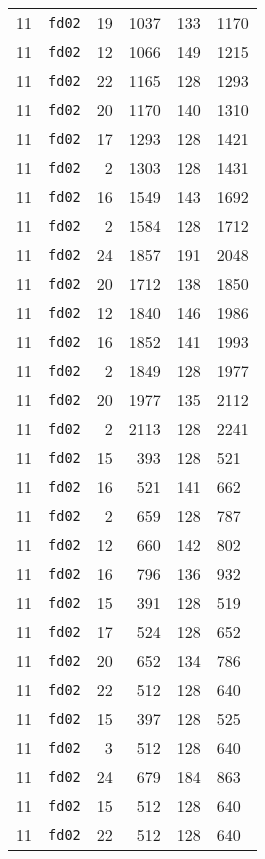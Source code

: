 \documentclass{article}
\begin{document}
\begin{table}[h!]
\begin{tabular}{llrrrl}
    11 & \texttt{fd02} & 19 & 1037 & 133 & 1170 \\
    11 & \texttt{fd02} & 12 & 1066 & 149 & 1215 \\
    11 & \texttt{fd02} & 22 & 1165 & 128 & 1293 \\
    11 & \texttt{fd02} & 20 & 1170 & 140 & 1310 \\
    11 & \texttt{fd02} & 17 & 1293 & 128 & 1421 \\
    11 & \texttt{fd02} & 2 & 1303 & 128 & 1431 \\
    11 & \texttt{fd02} & 16 & 1549 & 143 & 1692 \\
    11 & \texttt{fd02} & 2 & 1584 & 128 & 1712 \\
    11 & \texttt{fd02} & 24 & 1857 & 191 & 2048 \\
    11 & \texttt{fd02} & 20 & 1712 & 138 & 1850 \\
    11 & \texttt{fd02} & 12 & 1840 & 146 & 1986 \\
    11 & \texttt{fd02} & 16 & 1852 & 141 & 1993 \\
    11 & \texttt{fd02} & 2 & 1849 & 128 & 1977 \\
    11 & \texttt{fd02} & 20 & 1977 & 135 & 2112 \\
    11 & \texttt{fd02} & 2 & 2113 & 128 & 2241 \\
    11 & \texttt{fd02} & 15 & 393 & 128 & 521 \\
    11 & \texttt{fd02} & 16 & 521 & 141 & 662 \\
    11 & \texttt{fd02} & 2 & 659 & 128 & 787 \\
    11 & \texttt{fd02} & 12 & 660 & 142 & 802 \\
    11 & \texttt{fd02} & 16 & 796 & 136 & 932 \\
    11 & \texttt{fd02} & 15 & 391 & 128 & 519 \\
    11 & \texttt{fd02} & 17 & 524 & 128 & 652 \\
    11 & \texttt{fd02} & 20 & 652 & 134 & 786 \\
    11 & \texttt{fd02} & 22 & 512 & 128 & 640 \\
    11 & \texttt{fd02} & 15 & 397 & 128 & 525 \\
    11 & \texttt{fd02} & 3 & 512 & 128 & 640 \\
    11 & \texttt{fd02} & 24 & 679 & 184 & 863 \\
    11 & \texttt{fd02} & 15 & 512 & 128 & 640 \\
    11 & \texttt{fd02} & 22 & 512 & 128 & 640 \\

\end{tabular}
\end{table}
\end{document}
